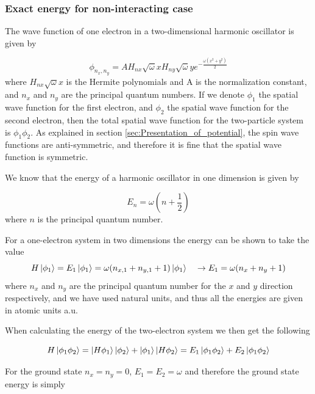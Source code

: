 \documentclass[norsk,a4paper,12pt]{article}
\begin{document}
\subsubsection{Exact energy for non-interacting case}

The wave function of one electron in a two-dimensional harmonic oscillator is given by

\begin{equation}
	\label{eq:one_e_wf_ho}
	\phi_{n_x, n_y} = A H_{nx} \sqrt{\omega} x H_{ny} \sqrt{\omega} y e^{-\frac{\omega(x^2 + y^2)}{2}}
\end{equation}
where $H_{nx} \sqrt{\omega} x$ is the Hermite polynomials and A is the normalization constant, and $n_x$ and $n_y$ are the principal quantum numbers. If we denote $\phi_1$ the spatial wave function for the first electron, and $\phi_2$ the spatial wave function for the second electron, then the total spatial wave function for the two-particle system is $\phi_1 \phi_2$. As explained in section \ref{sec:Presentation_of_potential}, the spin wave functions are anti-symmetric, and therefore it is fine that the spatial wave function is symmetric.

We know that the energy of a harmonic oscillator in one dimension is given by

\begin{equation}
	\label{eq:HO_energy}
	E_n = \omega (n + \frac{1}{2} )
\end{equation}
where $n$ is the principal quantum number.

For a one-electron system in two dimensions the energy can be shown to take the value 
\begin{equation}
H \ket{\phi_1} = E_1 \ket{\phi_1} = \omega(n_{x,1} + n_{y,1} + 1) \ket{\phi_1} \quad  \rightarrow E_1 = \omega(n_x + n_y + 1)
	\label{eq:exact_E_1P1D}
\end{equation}
where $n_x$ and $n_y$ are the principal quantum number for the $x$ and $y$ direction respectively, and we have used natural units, and thus all the energies are given in atomic units a.u.

When calculating the energy of the two-electron system we then get the following

\begin{equation}
	H \ket{\phi_1 \phi_2} = \ket{H \phi_1 } \ket{\phi_2} + \ket{\phi_1} \ket{H \phi_2} = E_1 \ket{\phi_1 \phi_2} + E_2 \ket{\phi_1 \phi_2} 
\end{equation}

For the ground state $n_x = n_y = 0$, $E_1 = E_2 = \omega$ and therefore the ground state energy is simply 
\end{document}
